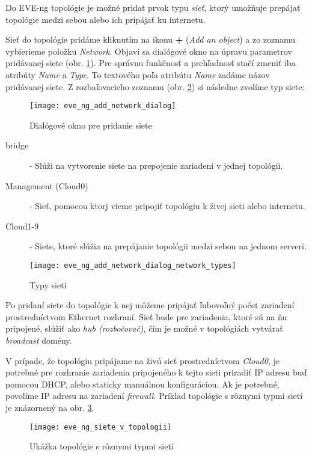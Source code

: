 Do EVE-ng topológie je možné pridať prvok typu \emph{sieť}, ktorý umožňuje prepájať topológie medzi sebou alebo ich pripájať ku internetu.

Sieť do topológie pridáme kliknutím na ikonu \textbf{+} (\emph{Add an object}) a zo zoznamu vybierieme položku \emph{Network}. Objaví sa dialógové okno na úpravu parametrov pridávanej siete (obr. \ref{obr:eve_ng_add_network_dialog}). Pre správnu funkčnosť a prehľadnosť stačí zmeniť iba atribúty \emph{Name} a \emph{Type}. To textového poľa atribútu \emph{Name} zadáme názov pridávanej siete. Z rozbaľovacieho zoznamu (obr. \ref{obr:eve_ng_add_network_dialog_network_types}) si následne zvolíme typ siete:

\begin{figure}
    \centering
    \texttt{[image: eve\_ng\_add\_network\_dialog]}
    \caption{Dialógové okno pre pridanie siete}
    \label{obr:eve_ng_add_network_dialog}
\end{figure}

\begin{description}
    \item [bridge] - Slúži na vytvorenie siete na prepojenie zariadení v jednej topológii.
    \item [Management (Cloud0)] - Sieť, pomocou ktorj vieme pripojiť topológiu k živej sieti alebo internetu.
    \item [Cloud1-9] - Siete, ktoré slúžia na prepájanie topológii medzi sebou na jednom serveri.
\end{description}

\begin{figure}
    \centering
    \texttt{[image: eve\_ng\_add\_network\_dialog\_network\_types]}
    \caption{Typy sietí}
    \label{obr:eve_ng_add_network_dialog_network_types}
\end{figure}

Po pridaní siete do topológie k nej môžeme pripájať ľubovoľný počet zariadení prostredníctvom Ethernet rozhraní. Sieť bude pre zariadenia, ktoré sú na ňu pripojené, slúžiť ako \emph{hub (rozbočovač)}, čím je možné v topológiách vytvárať \emph{broadcast} domény.

V prípade, že topológiu pripájame na živú sieť prostredníctvom \emph{Cloud0}, je potrebné pre rozhranie zariadenia pripojeného k tejto sieti priradiť IP adresu buď pomocou DHCP, alebo staticky manuálnou konfiguráciou. Ak je potrebné, povolíme IP adresu na zariadení \emph{firewall}. Príklad topológie s rôznymi typmi sietí je znázornený na obr. \ref{obr:eve_ng_siete_v_topologii}.

\begin{figure}
    \centering
    \texttt{[image: eve\_ng\_siete\_v\_topologii]}
    \caption{Ukážka topológie s rôznymi typmi sietí}
    \label{obr:eve_ng_siete_v_topologii}
\end{figure}